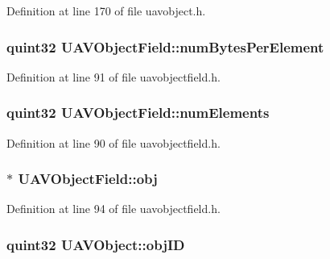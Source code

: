 Definition at line 170 of file uavobject.\-h.

\hypertarget{group___u_a_v_objects_plugin_gaed675e1711f18b1ab737f9e8e55dca35}{
\subsubsection[{num\-Bytes\-Per\-Element}]{\setlength{\rightskip}{0pt plus 5cm}quint32 U\-A\-V\-Object\-Field\-::num\-Bytes\-Per\-Element\hspace{0.3cm}{\ttfamily [protected]}}}\label{group___u_a_v_objects_plugin_gaed675e1711f18b1ab737f9e8e55dca35}


Definition at line 91 of file uavobjectfield.\-h.

\hypertarget{group___u_a_v_objects_plugin_gaa82f6e1f5deca501c58b45d902be0ef4}{
\subsubsection[{num\-Elements}]{\setlength{\rightskip}{0pt plus 5cm}quint32 U\-A\-V\-Object\-Field\-::num\-Elements\hspace{0.3cm}{\ttfamily [protected]}}}\label{group___u_a_v_objects_plugin_gaa82f6e1f5deca501c58b45d902be0ef4}


Definition at line 90 of file uavobjectfield.\-h.

\hypertarget{group___u_a_v_objects_plugin_ga750b9ade4270026bd2d02d37468597b5}{
\subsubsection[{obj}]{$\ast$ U\-A\-V\-Object\-Field\-::obj\hspace{0.3cm}{\ttfamily [protected]}}}\label{group___u_a_v_objects_plugin_ga750b9ade4270026bd2d02d37468597b5}


Definition at line 94 of file uavobjectfield.\-h.

\hypertarget{group___u_a_v_objects_plugin_gafc50acdaa311c9fd9aaddf90fd578c14}{
\subsubsection[{obj\-I\-D}]{\setlength{\rightskip}{0pt plus 5cm}quint32 U\-A\-V\-Object\-::obj\-I\-D\hspace{0.3cm}{\ttfamily [protected]}}}\label{group___u_a_v_objects_plugin_gafc50acdaa311c9fd9aaddf90fd578c14}


